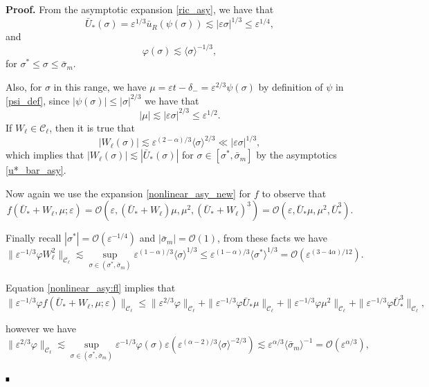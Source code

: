 \documentclass[letterpaper,11pt]{article}
\newcommand{\rmO}{\mathcal{O}}
\newcommand{\eps}{\varepsilon}
\newcommand{\lar}{ \lesssim }
\numberwithin{equation}{section}
\theoremstyle{plain}
\newenvironment{Proof}[1][.]%
 {\begin{trivlist}\item[]\textbf{Proof#1 }}%
 {\hspace*{\fill}$\rule{0.3\baselineskip}{0.35\baselineskip}$\end{trivlist}}
\begin{document}
\begin{Proof}
From the asymptotic expansion \eqref{ric_asy}, we have that
\begin{equation}\label{u*_bar_asy}
\bar{U}_*(\sigma) = \eps^{1/3} \bar{u}_R(\psi(\sigma)) \lar |\eps \sigma|^{1/3}\le \eps^{1/4},
\end{equation}
and
\begin{equation} 
\varphi(\sigma) \lar \langle\sigma\rangle^{-1/3} ,
\end{equation}
for $\sigma^*\le \sigma \le \bar{\sigma}_m$.

Also, for $\sigma$ in this range, we have $\mu = \eps t -\delta_- = \eps^{2/3}\psi(\sigma)$ by definition of $\psi$ in \eqref{psi_def}, since $|\psi(\sigma)|\le |\sigma|^{2/3}$ we have that 
\[
|\mu| \lar |\eps \sigma|^{2/3} \le \eps^{1/2}.
\]
If $W_\ell \in \mathcal{C}_\ell$, then it is true that
\[
|W_\ell(\sigma)| \lar \eps^{(2-\alpha)/3} \langle \sigma \rangle^{2/3} \ll |\eps\sigma|^{1/3}, 
\]
which implies that $|W_\ell(\sigma)| \lar |\bar{U}_*(\sigma)|$ for $\sigma \in [\sigma^*, \bar{\sigma}_m]$ by the asymptotics \eqref{u*_bar_asy}. 

Now again we use the expansion \eqref{nonlinear_asy_new} for $f$ to observe that 
\begin{equation}\label{nonlinear_asy:fl}
f(\bar{U}_*+W_\ell, \mu ;\eps) = \rmO(\eps, (\bar{U}_*+W_\ell)\mu, \mu^2, (\bar{U}_*+W_\ell)^3 ) = \rmO(\eps, \bar{U}_*\mu, \mu^2, \bar{U}_*^3).
\end{equation}

Finally recall $|\sigma^*| = \rmO(\eps^{-1/4})$ and $|\bar{\sigma}_m| = \rmO(1)$, from these facts we have
\begin{equation}\label{nl_est:Rl_1}
\|\eps^{-1/3}\varphi W_\ell^2\|_{\mathcal{C}_\ell} \lar \sup_{\sigma \in (\sigma^{*},\bar{\sigma}_m)} \eps^{(1-\alpha)/3}\langle \sigma\rangle^{1/3}  \le \eps^{(1-\alpha)/3} \langle \sigma^{*} \rangle^{1/3} = \rmO(\eps^{(3-4\alpha)/12}).
\end{equation}

Equation \eqref{nonlinear_asy:fl} implies that
\[
\|\eps^{-1/3}\varphi f(\bar{U}_*+W_\ell, \mu ;\eps)\|_{\mathcal{C}_\ell} \le \|\eps^{2/3}\varphi \|_{\mathcal{C}_\ell} + \|\eps^{-1/3}\varphi \bar{U}_*\mu \|_{\mathcal{C}_\ell}+\|\eps^{-1/3}\varphi \mu^2 \|_{\mathcal{C}_\ell}  + \|\eps^{-1/3}\varphi \bar{U}_*^3 \|_{\mathcal{C}_\ell},
\]

however we have
\[
\|\eps^{2/3}\varphi \|_{\mathcal{C}_\ell} \lar \sup_{\sigma \in (\sigma^{*},\bar{\sigma}_m)} \eps^{-1/3} \varphi(\sigma) \eps (\eps^{(\alpha-2)/3}\langle \sigma\rangle^{-2/3}) \lar \eps^{\alpha/3} \langle\bar{\sigma}_m\rangle^{-1} =\rmO(\eps^{\alpha/3}),
\]


\end{Proof}
\end{document}
